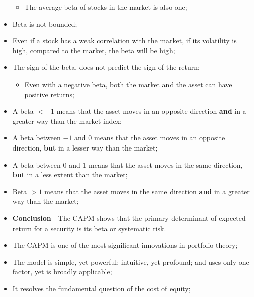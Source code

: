 \documentclass[11pt,a4paper]{report}
\begin{document}
\begin{itemize}
    \begin{itemize}
        \item The average beta of stocks in the market is also one;
    \end{itemize}
    \item Beta is not bounded;
    \item Even if a stock has a weak correlation with the market, if its volatility is high, compared to the market, the beta will be high;
    \item The sign of the beta, does not predict the sign of the return;
    \begin{itemize}
        \item Even with a negative beta, both the market and the asset can have positive returns;
    \end{itemize}
    \item A beta $< - 1$ means that the asset moves in an opposite direction \textbf{and} in a greater way than the market index;
    \item A beta between $-1$ and $0$ means that the asset moves in an opposite direction, \textbf{but} in a lesser way than the market;
    \item A beta between $0$ and $1$ means that the asset moves in the same direction, \textbf{but} in a less extent than the market;
    \item Beta $>1$ means that the asset moves in the same direction \textbf{and} in a greater way than the market;
    \item \textbf{Conclusion} - The CAPM shows that the primary determinant of expected return for a security is its beta or systematic risk.
    \item The CAPM is one of the most significant innovations in portfolio theory;
    \item The model is simple, yet powerful; intuitive, yet profound; and uses only one factor, yet is broadly applicable;
    \item It resolves the fundamental question of the cost of equity;
\end{itemize}
\end{document}
